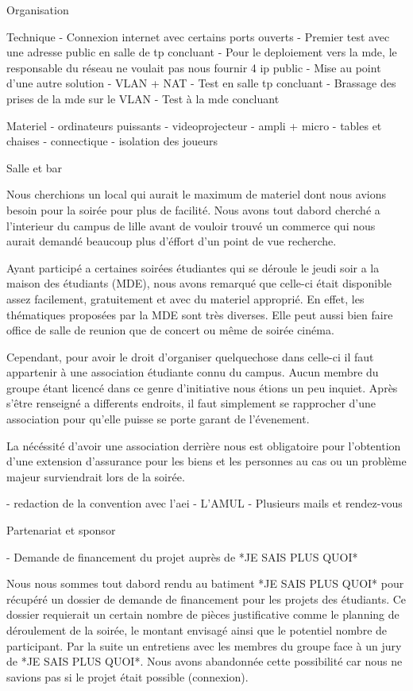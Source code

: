 Organisation

	Technique
		- Connexion internet avec certains ports ouverts
		- Premier test avec une adresse public en salle de tp concluant
		- Pour le deploiement vers la mde, le responsable du réseau ne voulait pas nous fournir 4 ip public
		- Mise au point d'une autre solution
		       - VLAN + NAT
		- Test en salle tp concluant
 		- Brassage des prises de la mde sur le VLAN
		- Test à la mde concluant

	Materiel
		- ordinateurs puissants
		- videoprojecteur
		- ampli + micro
		- tables et chaises
		- connectique
    - isolation des joueurs

	Salle et bar

    Nous cherchions un local qui aurait le maximum de materiel dont nous
    avions besoin pour la soirée pour plus de facilité. Nous avons tout
    dabord cherché a l'interieur du campus de lille avant de vouloir trouvé
    un commerce qui nous aurait demandé beaucoup plus d'éffort d'un point de
    vue recherche.

    Ayant participé a certaines soirées étudiantes qui se déroule le jeudi
    soir a la maison des étudiants (MDE), nous avons remarqué que celle-ci
    était disponible assez facilement, gratuitement et avec du materiel
    approprié. En effet, les thématiques proposées par la MDE sont très
    diverses. Elle peut aussi bien faire office de salle de reunion que de
    concert ou même de soirée cinéma.

    Cependant, pour avoir le droit d'organiser quelquechose dans celle-ci il
    faut appartenir à une association étudiante connu du campus. Aucun
    membre du groupe étant licencé dans ce genre d'initiative nous étions un
    peu inquiet. Après s'être renseigné a differents endroits, il faut
    simplement se rapprocher d'une association pour qu'elle puisse se porte
    garant de l'évenement.

    La nécéssité d'avoir une association derrière nous est obligatoire pour
    l'obtention d'une extension d'assurance pour les biens et les personnes
    au cas ou un problème majeur surviendrait lors de la soirée.

    - redaction de la convention avec l'aei
    - L'AMUL
    - Plusieurs mails et rendez-vous

	Partenariat et sponsor

    - Demande de financement du projet auprès de *JE SAIS PLUS QUOI*

      Nous nous sommes tout dabord rendu au batiment *JE SAIS PLUS QUOI*
      pour récupéré un dossier de demande de financement pour les projets des
      étudiants. Ce dossier requierait un certain nombre de pièces
      justificative comme le planning de déroulement de la soirée, le montant
      envisagé ainsi que le potentiel nombre de participant. Par la suite un
      entretiens avec les membres du groupe face à un jury de *JE SAIS
      PLUS QUOI*. Nous avons abandonnée cette possibilité car nous ne savions
      pas si le projet était possible (connexion).

